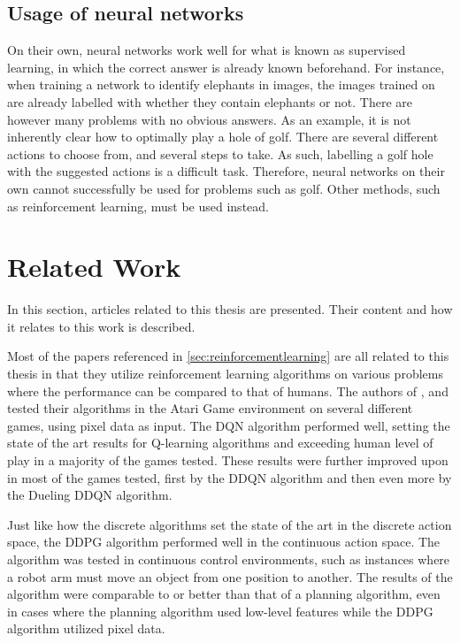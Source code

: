 \documentclass{kththesis}
\begin{document}
\subsection{Usage of neural networks}
On their own, neural networks work well for what is known as supervised learning, in which the correct answer is already known beforehand. For instance, when training a network to identify elephants in images, the images trained on are already labelled with whether they contain elephants or not. There are however many problems with no obvious answers. As an example, it is not inherently clear how to optimally play a hole of golf. There are several different actions to choose from, and several steps to take. As such, labelling a golf hole with the suggested actions is a difficult task. Therefore, neural networks on their own cannot successfully be used for problems such as golf. Other methods, such as reinforcement learning, must be used instead.

\section{Related Work}
In this section, articles related to this thesis are presented. Their content and how it relates to this work is described.

Most of the papers referenced in \autoref{sec:reinforcementlearning} are all related to this thesis in that they utilize reinforcement learning algorithms on various problems where the performance can be compared to that of humans. The authors of \parencite{mnih2015human}, \parencite{van2016deep} and \parencite{wang2015dueling} tested their algorithms in the Atari Game environment on several different games, using pixel data as input. The DQN algorithm performed well, setting the state of the art results for Q-learning algorithms and exceeding human level of play in a majority of the games tested. These results were further improved upon in most of the games tested, first by the DDQN algorithm and then even more by the Dueling DDQN algorithm. 

Just like how the discrete algorithms set the state of the art in the discrete action space, the DDPG algorithm performed well in the continuous action space. The algorithm was tested in continuous control environments, such as instances where a robot arm must move an object from one position to another. The results of the algorithm were comparable to or better than that of a planning algorithm, even in cases where the planning algorithm used low-level features while the DDPG algorithm utilized pixel data. \parencite{lillicrap2015continuous}
\end{document}
